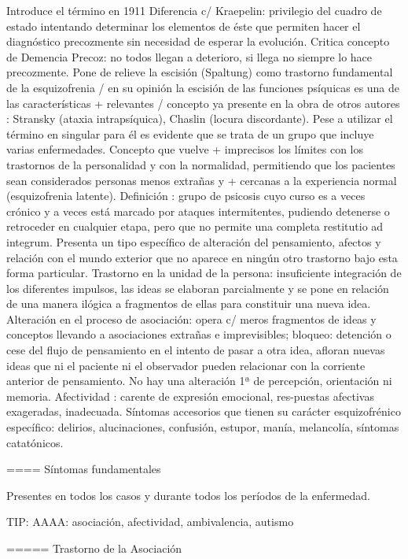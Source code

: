 Introduce el término en 1911 Diferencia c/ Kraepelin: privilegio del cuadro de estado intentando determinar los elementos de éste que permiten hacer el diagnóstico precozmente sin necesidad de esperar la evolución. Critica concepto de Demencia Precoz: no todos llegan a deterioro, si llega no siempre lo hace precozmente. Pone de relieve la escisión (Spaltung) como trastorno fundamental de la esquizofrenia / en su opinión la escisión de las funciones psíquicas es una de las características + relevantes / concepto ya presente en la obra de otros autores : Stransky (ataxia intrapsíquica), Chaslin (locura discordante). Pese a utilizar el término en singular para él es evidente que se trata de un grupo que incluye varias enfermedades. Concepto que vuelve + imprecisos los límites con los trastornos de la personalidad y con la normalidad, permitiendo que los pacientes sean considerados personas menos extrañas y + cercanas a la experiencia normal (esquizofrenia latente). 
Definición : grupo de psicosis cuyo curso es a veces crónico y a veces está marcado por ataques intermitentes, pudiendo detenerse o retroceder en cualquier etapa, pero que no permite una completa restitutio ad integrum. Presenta un tipo específico de alteración del pensamiento, afectos y relación con el mundo exterior que no aparece en ningún otro trastorno bajo esta forma particular. Trastorno en la unidad de la persona: insuficiente integración de los diferentes impulsos, las ideas se elaboran parcialmente y se pone en relación de una manera ilógica a fragmentos de ellas para constituir una nueva idea. Alteración en el proceso de asociación: opera c/ meros fragmentos de ideas y conceptos llevando a asociaciones extrañas e imprevisibles; bloqueo: detención o cese del flujo de pensamiento en el intento de pasar a otra idea, afloran nuevas ideas que ni el paciente ni el observador pueden relacionar con la corriente anterior de pensamiento. No hay una alteración 1ª de percepción, orientación ni memoria. Afectividad : carente de expresión emocional, res-puestas afectivas exageradas, inadecuada. Síntomas accesorios que tienen su carácter esquizofrénico específico: delirios, alucinaciones, confusión, estupor, manía, melancolía, síntomas catatónicos.

==== Síntomas fundamentales

Presentes en todos los casos y durante todos los períodos de la enfermedad.

TIP: AAAA: asociación, afectividad, ambivalencia, autismo

===== Trastorno de la Asociación

